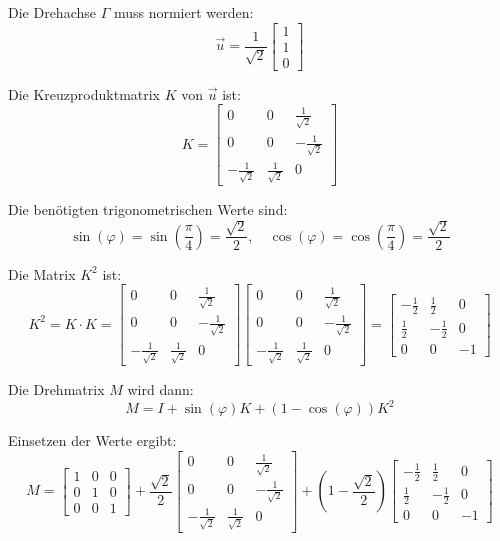 Die Drehachse \(\Gamma\) muss normiert werden:
\[
\vec{u} = \frac{1}{\sqrt{2}} \begin{bmatrix} 1 \\ 1 \\ 0 \end{bmatrix}
\]

Die Kreuzproduktmatrix \( K \) von \(\vec{u}\) ist:
\[
K = \begin{bmatrix}
0 & 0 & \frac{1}{\sqrt{2}} \\
0 & 0 & -\frac{1}{\sqrt{2}} \\
-\frac{1}{\sqrt{2}} & \frac{1}{\sqrt{2}} & 0
\end{bmatrix}
\]

Die benötigten trigonometrischen Werte sind:
\[
\sin(\varphi) = \sin\left(\frac{\pi}{4}\right) = \frac{\sqrt{2}}{2}, \quad \cos(\varphi) = \cos\left(\frac{\pi}{4}\right) = \frac{\sqrt{2}}{2}
\]

Die Matrix \( K^2 \) ist:
\[
K^2 = K \cdot K = \begin{bmatrix}
0 & 0 & \frac{1}{\sqrt{2}} \\
0 & 0 & -\frac{1}{\sqrt{2}} \\
-\frac{1}{\sqrt{2}} & \frac{1}{\sqrt{2}} & 0
\end{bmatrix} \begin{bmatrix}
0 & 0 & \frac{1}{\sqrt{2}} \\
0 & 0 & -\frac{1}{\sqrt{2}} \\
-\frac{1}{\sqrt{2}} & \frac{1}{\sqrt{2}} & 0
\end{bmatrix} = \begin{bmatrix}
-\frac{1}{2} & \frac{1}{2} & 0 \\
\frac{1}{2} & -\frac{1}{2} & 0 \\
0 & 0 & -1
\end{bmatrix}
\]

Die Drehmatrix \( M \) wird dann:
\[
M = I + \sin(\varphi) K + (1 - \cos(\varphi)) K^2
\]

Einsetzen der Werte ergibt:
\[
M = \begin{bmatrix}
1 & 0 & 0 \\
0 & 1 & 0 \\
0 & 0 & 1
\end{bmatrix} + \frac{\sqrt{2}}{2} \begin{bmatrix}
0 & 0 & \frac{1}{\sqrt{2}} \\
0 & 0 & -\frac{1}{\sqrt{2}} \\
-\frac{1}{\sqrt{2}} & \frac{1}{\sqrt{2}} & 0
\end{bmatrix} + \left(1 - \frac{\sqrt{2}}{2}\right) \begin{bmatrix}
-\frac{1}{2} & \frac{1}{2} & 0 \\
\frac{1}{2} & -\frac{1}{2} & 0 \\
0 & 0 & -1
\end{bmatrix}
\]

